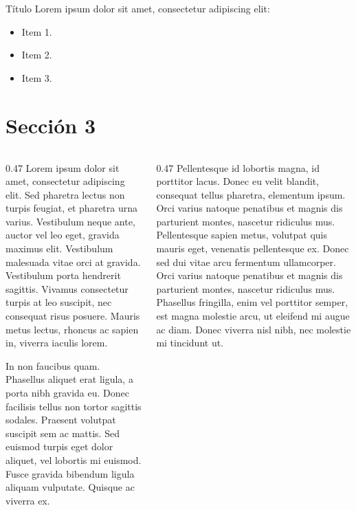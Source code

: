 \documentclass[article,aspectratio=169,10pt]{beamer}
\begin{document}
	\begin{frame}{Título}
		\justifying
		\hspace*{20pt} Lorem ipsum dolor sit amet, consectetur adipiscing elit:
		\begin{itemize}
			\item Item 1.
			\item Item 2.
			\item Item 3.
		\end{itemize}
	\end{frame}
	
	\section{Sección 3}
	
	\begin{frame}
		\begin{columns}
			\begin{column}{0.47\textwidth}\setlength\parskip{0.4\baselineskip}
				\justifying
				\hspace*{20pt} Lorem ipsum dolor sit amet, consectetur adipiscing elit. Sed pharetra lectus non turpis feugiat, et pharetra urna varius. Vestibulum neque ante, auctor vel leo eget, gravida maximus elit. Vestibulum malesuada vitae orci at gravida. Vestibulum porta hendrerit sagittis. Vivamus consectetur turpis at leo suscipit, nec consequat risus posuere. Mauris metus lectus, rhoncus ac sapien in, viverra iaculis lorem.
				
				\hspace*{20pt} In non faucibus quam. Phasellus aliquet erat ligula, a porta nibh gravida eu. Donec facilisis tellus non tortor sagittis sodales. Praesent volutpat suscipit sem ac mattis. Sed euismod turpis eget dolor aliquet, vel lobortis mi euismod. Fusce gravida bibendum ligula aliquam vulputate. Quisque ac viverra ex.
			\end{column}
			\begin{column}{0.47\textwidth}\setlength\parskip{0.4\baselineskip}
				\justifying
				\hspace*{20pt} Pellentesque id lobortis magna, id porttitor lacus. Donec eu velit blandit, consequat tellus pharetra, elementum ipsum. Orci varius natoque penatibus et magnis dis parturient montes, nascetur ridiculus mus. Pellentesque sapien metus, volutpat quis mauris eget, venenatis pellentesque ex. Donec sed dui vitae arcu fermentum ullamcorper. Orci varius natoque penatibus et magnis dis parturient montes, nascetur ridiculus mus. Phasellus fringilla, enim vel porttitor semper, est magna molestie arcu, ut eleifend mi augue ac diam. Donec viverra nisl nibh, nec molestie mi tincidunt ut.
			\end{column}
		\end{columns}
	\end{frame}
	
\end{document}
